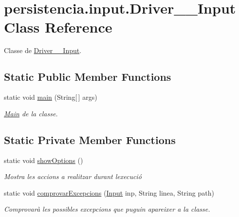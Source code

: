 \hypertarget{classpersistencia_1_1input_1_1Driver____Input}{}\section{persistencia.\+input.\+Driver\+\_\+\+\_\+\+Input Class Reference}
\label{classpersistencia_1_1input_1_1Driver____Input}


Classe de \hyperlink{classpersistencia_1_1input_1_1Driver____Input}{Driver\+\_\+\+\_\+\+Input}.  


\subsection*{Static Public Member Functions}
\begin{DoxyCompactItemize}
\item 
static void \hyperlink{classpersistencia_1_1input_1_1Driver____Input_a6a020d74862cb62628ab644253271179}{main} (String\mbox{[}$\,$\mbox{]} args)
\begin{DoxyCompactList}\small\item\em \hyperlink{classMain}{Main} de la classe. \end{DoxyCompactList}\end{DoxyCompactItemize}
\subsection*{Static Private Member Functions}
\begin{DoxyCompactItemize}
\item 
static void \hyperlink{classpersistencia_1_1input_1_1Driver____Input_a4f8a0f13847071d675771817ee212f2c}{show\+Options} ()
\begin{DoxyCompactList}\small\item\em Mostra les accions a realitzar durant l\textquotesingle{}execució \end{DoxyCompactList}\item 
static void \hyperlink{classpersistencia_1_1input_1_1Driver____Input_a46e7f159cd6fda2de6eaac3cec973963}{comprovar\+Excepcions} (\hyperlink{classpersistencia_1_1input_1_1Input}{Input} inp, String linea, String path)
\begin{DoxyCompactList}\small\item\em Comprovarà les possibles excepcions que puguin apareixer a la classe. \end{DoxyCompactList}\end{DoxyCompactItemize}


